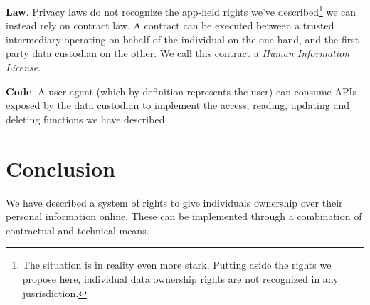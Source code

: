 \documentclass[11pt, oneside]{article}   	%
\begin{document}
\textbf{Law}. Privacy laws do not recognize the app-held rights we've described\footnote{The situation is in reality even more stark. Putting aside the rights we propose here, individual data ownership rights are not recognized in any jusrisdiction.} we can instead rely on contract law. A contract can be executed between a trusted intermediary operating on behalf of the individual on the one hand, and the first-party data custodian on the other. We call this contract a \emph{Human Information License}. 

\textbf{Code}. A user agent (which by definition represents the user) can consume APIs exposed by the data custodian to implement the access, reading, updating and deleting functions we have described. 

\section{Conclusion}
We have described a system of rights to give individuals ownership over their personal information online. These can be implemented through a combination of contractual and technical means.



\end{document}
